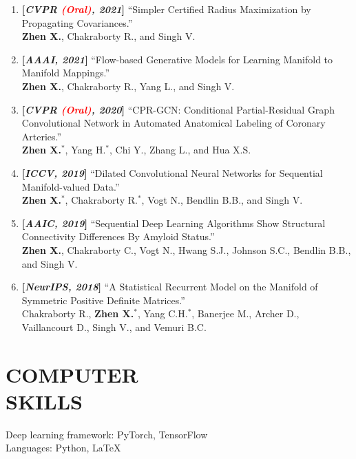 \documentclass[margin]{res}
\begin{document}
\begin{resume}
\begin{enumerate}[noitemsep,wide=0pt,leftmargin=\dimexpr\labelwidth + 2\labelsep\relax]
                \item \textbf{[\emph{CVPR \textcolor{red}{(Oral)}, 2021}]} ``Simpler Certified Radius Maximization by Propagating Covariances.''\\
                            \textbf{Zhen X.}, Chakraborty R., and Singh V. 
                \item \textbf{[\emph{AAAI, 2021}]} ``Flow-based Generative Models for Learning Manifold to Manifold Mappings.''\\
                            \textbf{Zhen X.}, Chakraborty R., Yang L., and Singh V. 
                \item \textbf{[\emph{CVPR \textcolor{red}{(Oral)}, 2020}]} ``CPR-GCN: Conditional Partial-Residual Graph Convolutional Network in Automated Anatomical Labeling of Coronary Arteries.''\\
                            \textbf{Zhen X.}$^*$, Yang H.$^*$, Chi Y., Zhang L., and Hua X.S.   
                \item \textbf{[\emph{ICCV, 2019}]} ``Dilated Convolutional Neural Networks for Sequential Manifold-valued Data.'' \\
                             \textbf{Zhen X.}$^*$, Chakraborty R.$^*$, Vogt N., Bendlin B.B., and Singh V. 
                \item \textbf{[\emph{AAIC, 2019}]} ``Sequential Deep Learning Algorithms Show Structural Connectivity Differences By Amyloid Status.''\\
                             \textbf{Zhen X.}, Chakraborty C., Vogt N., Hwang S.J., Johnson S.C., Bendlin B.B., and Singh V. 
                \item \textbf{[\emph{NeurIPS, 2018}]} ``A Statistical Recurrent Model on the Manifold of Symmetric Positive Definite Matrices.''\\
                             Chakraborty R., \textbf{Zhen X.}$^*$, Yang C.H.$^*$, Banerjee M., Archer D., Vaillancourt D., Singh V., and Vemuri B.C.
                \end{enumerate}
\vspace{-1em}
\section{COMPUTER \\ SKILLS} 
                Deep learning framework: PyTorch, TensorFlow\\
                Languages: Python, \LaTeX


\end{resume}
\end{document}
